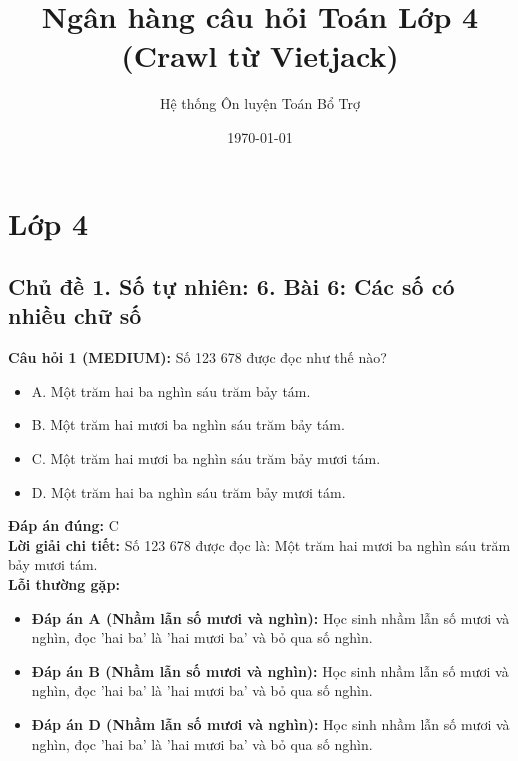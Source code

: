 \documentclass{article}
\title{Ngân hàng câu hỏi Toán Lớp 4 (Crawl từ Vietjack)}
\author{Hệ thống Ôn luyện Toán Bổ Trợ}
\date{\today}
\begin{document}
\maketitle

\tableofcontents
\newpage
\section{Lớp 4}
\subsection{Chủ đề 1. Số tự nhiên: 6. Bài 6: Các số có nhiều chữ số}
\begin{minipage}{\textwidth}
\noindent\textbf{Câu hỏi 1 (MEDIUM):} Số 123 678 được đọc như thế nào? 
\begin{itemize}[label={}]
    \item A. Một trăm hai ba nghìn sáu trăm bảy tám.
    \item B. Một trăm hai mươi ba nghìn sáu trăm bảy tám.
    \item C. Một trăm hai mươi ba nghìn sáu trăm bảy mươi tám.
    \item D. Một trăm hai ba nghìn sáu trăm bảy mươi tám.
\end{itemize}
\textbf{Đáp án đúng:} C \\
\textbf{Lời giải chi tiết:} Số 123 678 được đọc là: Một trăm hai mươi ba nghìn sáu trăm bảy mươi tám. \\
\textbf{Lỗi thường gặp:}
\begin{itemize}
  \item \textbf{Đáp án A (Nhầm lẫn số mươi và nghìn):} Học sinh nhầm lẫn số mươi và nghìn, đọc 'hai ba' là 'hai mươi ba' và bỏ qua số nghìn.
  \item \textbf{Đáp án B (Nhầm lẫn số mươi và nghìn):} Học sinh nhầm lẫn số mươi và nghìn, đọc 'hai ba' là 'hai mươi ba' và bỏ qua số nghìn.
  \item \textbf{Đáp án D (Nhầm lẫn số mươi và nghìn):} Học sinh nhầm lẫn số mươi và nghìn, đọc 'hai ba' là 'hai mươi ba' và bỏ qua số nghìn.
\end{itemize}
\end{minipage}
\vspace{1em}
\end{document}

